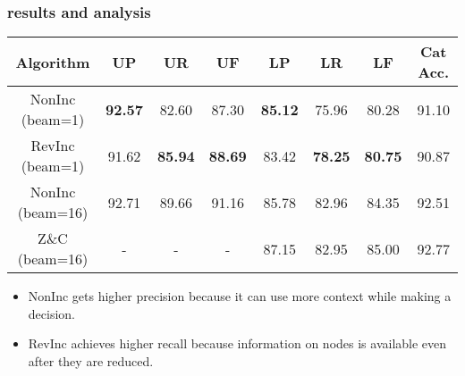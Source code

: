 \documentclass[10pt,usepdftitle=false,hyperref={unicode}]{beamer}
\begin{document}
\begin{frame}
    \frametitle{results and analysis}
    \begingroup
    \scriptsize
    \begin{center}
    \begin{table}
    \caption{Performance on the development data\footnote{`U' stands for unlabaled and `L' stands for labeles. `P', `R' and `F' are precision, recall and F-score respectively.}.}
        \begin{table}[h]
            \begin{tabular}{cccccccc}
                \toprule
                Algorithm        & UP
                                                  & UR             & UF             & LP             & LR             & LF             & Cat Acc. \\
                \midrule
                NonInc (beam=1)  & \textbf{92.57} & 82.60          & 87.30          & \textbf{85.12} & 75.96          & 80.28          & 91.10 \\
                RevInc (beam=1)  & 91.62          & \textbf{85.94} & \textbf{88.69} & 83.42          & \textbf{78.25} & \textbf{80.75} & 90.87 \\
                \midrule
                NonInc (beam=16) & 92.71          & 89.66          & 91.16          & 85.78          & 82.96          & 84.35          & 92.51 \\
                Z\&C (beam=16)   & -              & -              & -              & 87.15          & 82.95          & 85.00          & 92.77 \\
                \bottomrule
            \end{tabular}
        \end{table}
    \end{table}
    \end{center}
    \endgroup
    \smallskip

    \begin{itemize}
        \item NonInc gets higher precision because it can use more context while making a decision.
        \item RevInc achieves higher recall because information on nodes is available even after they are reduced.
    \end{itemize}
\end{frame}
\end{document}
